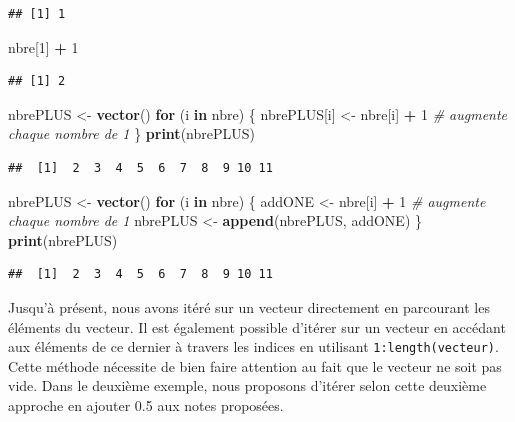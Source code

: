 \documentclass[
]{book}
\newenvironment{Shaded}{\begin{snugshade}}{\end{snugshade}}
\newcommand{\CommentTok}[1]{\textcolor[rgb]{0.56,0.35,0.01}{\textit{#1}}}
\newcommand{\ControlFlowTok}[1]{\textcolor[rgb]{0.13,0.29,0.53}{\textbf{#1}}}
\newcommand{\DecValTok}[1]{\textcolor[rgb]{0.00,0.00,0.81}{#1}}
\newcommand{\FunctionTok}[1]{\textcolor[rgb]{0.13,0.29,0.53}{\textbf{#1}}}
\newcommand{\NormalTok}[1]{#1}
\newcommand{\OtherTok}[1]{\textcolor[rgb]{0.56,0.35,0.01}{#1}}
\newcommand{\SpecialCharTok}[1]{\textcolor[rgb]{0.81,0.36,0.00}{\textbf{#1}}}
\begin{document}
\begin{verbatim}
## [1] 1
\end{verbatim}

\begin{Shaded}
\begin{Highlighting}[]
\NormalTok{nbre[}\DecValTok{1}\NormalTok{] }\SpecialCharTok{+} \DecValTok{1} 
\end{Highlighting}
\end{Shaded}

\begin{verbatim}
## [1] 2
\end{verbatim}

\begin{Shaded}
\begin{Highlighting}[]
\NormalTok{nbrePLUS }\OtherTok{\textless{}{-}} \FunctionTok{vector}\NormalTok{()}
\ControlFlowTok{for}\NormalTok{ (i }\ControlFlowTok{in}\NormalTok{ nbre) \{}
\NormalTok{  nbrePLUS[i] }\OtherTok{\textless{}{-}}\NormalTok{ nbre[i] }\SpecialCharTok{+} \DecValTok{1}  \CommentTok{\# augmente chaque nombre de 1}
\NormalTok{\}}
\FunctionTok{print}\NormalTok{(nbrePLUS)}
\end{Highlighting}
\end{Shaded}

\begin{verbatim}
##  [1]  2  3  4  5  6  7  8  9 10 11
\end{verbatim}

\begin{Shaded}
\begin{Highlighting}[]
\NormalTok{nbrePLUS }\OtherTok{\textless{}{-}} \FunctionTok{vector}\NormalTok{()}
\ControlFlowTok{for}\NormalTok{ (i }\ControlFlowTok{in}\NormalTok{ nbre) \{}
\NormalTok{  addONE }\OtherTok{\textless{}{-}}\NormalTok{ nbre[i] }\SpecialCharTok{+} \DecValTok{1}  \CommentTok{\# augmente chaque nombre de 1}
\NormalTok{  nbrePLUS }\OtherTok{\textless{}{-}} \FunctionTok{append}\NormalTok{(nbrePLUS, addONE)}
\NormalTok{\}}
\FunctionTok{print}\NormalTok{(nbrePLUS)}
\end{Highlighting}
\end{Shaded}

\begin{verbatim}
##  [1]  2  3  4  5  6  7  8  9 10 11
\end{verbatim}

Jusqu'à présent, nous avons itéré sur un vecteur directement en parcourant les éléments du vecteur. Il est également possible d'itérer sur un vecteur en accédant aux éléments de ce dernier à travers les indices en utilisant \texttt{1:length(vecteur)}. Cette méthode nécessite de bien faire attention au fait que le vecteur ne soit pas vide. Dans le deuxième exemple, nous proposons d'itérer selon cette deuxième approche en ajouter 0.5 aux notes proposées.
\end{document}
